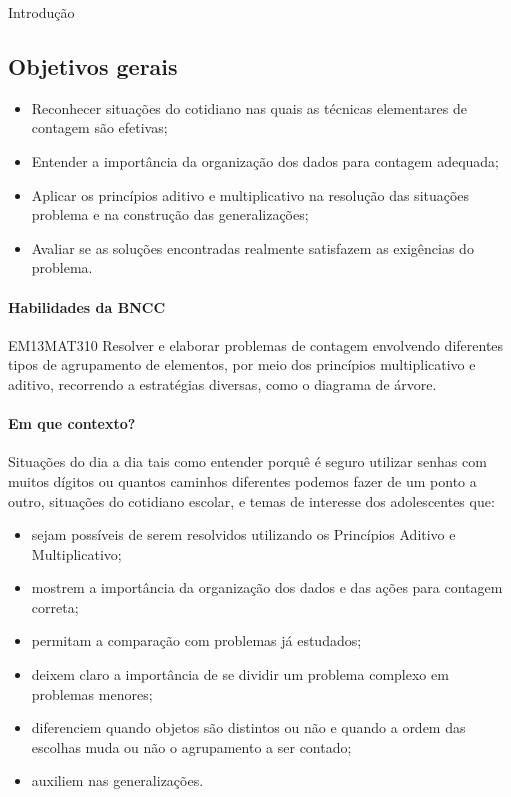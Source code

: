 \begin{apresentacao}{Introdução}
\subsection{Objetivos gerais}
\begin{itemize}
\item Reconhecer situações do cotidiano nas quais as técnicas elementares de contagem são efetivas; 
\item Entender a importância da organização dos dados para contagem adequada; 
\item Aplicar os princípios aditivo e multiplicativo na resolução das situações problema e na construção das generalizações; 
\item Avaliar se as soluções encontradas realmente satisfazem as exigências do problema.
\end{itemize}

\paragraph{Habilidades da BNCC}

\begin{habilities}{EM13MAT310}
Resolver e elaborar problemas de contagem envolvendo diferentes tipos de agrupamento de elementos, por meio dos princípios multiplicativo e aditivo, recorrendo a estratégias diversas, como o diagrama de árvore.
\end{habilities}

\paragraph{Em que contexto?}

Situações do dia a dia tais como entender porquê é seguro utilizar senhas com muitos dígitos ou quantos caminhos diferentes podemos fazer de um ponto a outro, situações do cotidiano escolar, e temas de interesse dos adolescentes que:

\begin{itemize}

\item sejam possíveis de serem resolvidos utilizando os Princípios Aditivo e Multiplicativo;
\item mostrem a importância da organização dos dados e das ações para contagem correta;
\item permitam a comparação com problemas já estudados;
\item deixem claro a importância de se dividir um problema complexo em problemas menores;
\item diferenciem quando objetos são distintos ou não e quando a ordem das escolhas muda ou não o agrupamento a ser contado;
\item auxiliem nas generalizações.


\end{itemize}
\end{apresentacao}
